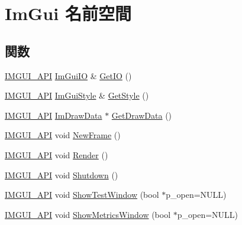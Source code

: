 \hypertarget{namespace_im_gui}{}\section{Im\+Gui 名前空間}
\label{namespace_im_gui}
\subsection*{関数}
\begin{DoxyCompactItemize}
\item 
\mbox{\hyperlink{imgui_8h_a43829975e84e45d1149597467a14bbf5}{I\+M\+G\+U\+I\+\_\+\+A\+PI}} \mbox{\hyperlink{struct_im_gui_i_o}{Im\+Gui\+IO}} \& \mbox{\hyperlink{namespace_im_gui_a3179e560812f878f3961ce803a5d9302}{Get\+IO}} ()
\item 
\mbox{\hyperlink{imgui_8h_a43829975e84e45d1149597467a14bbf5}{I\+M\+G\+U\+I\+\_\+\+A\+PI}} \mbox{\hyperlink{struct_im_gui_style}{Im\+Gui\+Style}} \& \mbox{\hyperlink{namespace_im_gui_abafef4bb3e3654efd96a47b2e22870a7}{Get\+Style}} ()
\item 
\mbox{\hyperlink{imgui_8h_a43829975e84e45d1149597467a14bbf5}{I\+M\+G\+U\+I\+\_\+\+A\+PI}} \mbox{\hyperlink{struct_im_draw_data}{Im\+Draw\+Data}} $\ast$ \mbox{\hyperlink{namespace_im_gui_ab73131dc44b1267dac04f0c2bb0af983}{Get\+Draw\+Data}} ()
\item 
\mbox{\hyperlink{imgui_8h_a43829975e84e45d1149597467a14bbf5}{I\+M\+G\+U\+I\+\_\+\+A\+PI}} void \mbox{\hyperlink{namespace_im_gui_ab3f1fc018f903b7ad79fd10663375774}{New\+Frame}} ()
\item 
\mbox{\hyperlink{imgui_8h_a43829975e84e45d1149597467a14bbf5}{I\+M\+G\+U\+I\+\_\+\+A\+PI}} void \mbox{\hyperlink{namespace_im_gui_ab51a164f547317c16c441f1599e3946d}{Render}} ()
\item 
\mbox{\hyperlink{imgui_8h_a43829975e84e45d1149597467a14bbf5}{I\+M\+G\+U\+I\+\_\+\+A\+PI}} void \mbox{\hyperlink{namespace_im_gui_aeba34069558d4fbcf734a9c92ce3b773}{Shutdown}} ()
\item 
\mbox{\hyperlink{imgui_8h_a43829975e84e45d1149597467a14bbf5}{I\+M\+G\+U\+I\+\_\+\+A\+PI}} void \mbox{\hyperlink{namespace_im_gui_a52880ae1ecdd704a083558d31c9bfa50}{Show\+Test\+Window}} (bool $\ast$p\+\_\+open=N\+U\+LL)
\item 
\mbox{\hyperlink{imgui_8h_a43829975e84e45d1149597467a14bbf5}{I\+M\+G\+U\+I\+\_\+\+A\+PI}} void \mbox{\hyperlink{namespace_im_gui_afe7a28c6eb52fff3cc27d5a698fea4ff}{Show\+Metrics\+Window}} (bool $\ast$p\+\_\+open=N\+U\+LL)
\item 

\end{DoxyCompactItemize}
